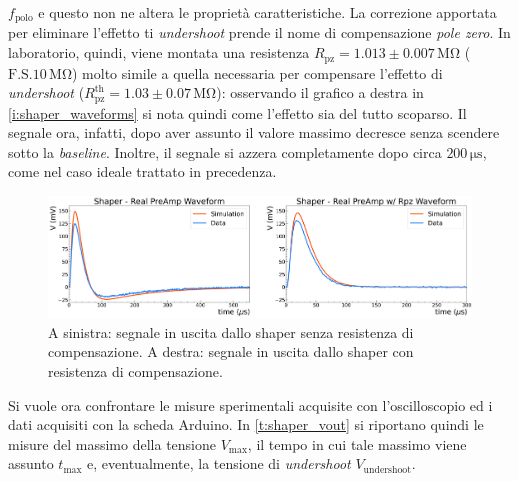 \documentclass[a4paper,11pt]{article} %
\begin{document}
$f_{\text{polo}}$ e questo non ne altera le proprietà caratteristiche. La correzione apportata per eliminare l'effetto ti
\textit{undershoot} prende il nome di compensazione \textit{pole zero}. In laboratorio, quindi, viene montata una
resistenza $R_{\text{pz}} = 1.013 \pm 0.007 \, \si{\mega\ohm}$ ($\text{F.S.} 10\,\si{\mega\ohm}$) molto simile a quella
necessaria per compensare l'effetto di \textit{undershoot} ($R_{\text{pz}}^{\text{th}} = 1.03 \pm 0.07 \,
\si{\mega\ohm}$): osservando il grafico a destra in \autoref{i:shaper_waveforms} si nota quindi come l'effetto sia del
tutto scoparso. Il segnale ora, infatti, dopo aver assunto il valore massimo decresce senza scendere sotto la
\textit{baseline}. Inoltre, il segnale si azzera completamente dopo circa $200\,\si{\us}$, come nel caso ideale trattato
in precedenza.
\begin{figure}[H]
	\centering
	\includegraphics[width=\linewidth]{../Plots/Shaper/shaper_preamp_waveforms.png}
	\caption{\small A sinistra: segnale in uscita dallo shaper senza resistenza di compensazione. 
					A destra: segnale in uscita dallo shaper con resistenza di compensazione.}
	\label{i:shaper_waveforms}
\end{figure}
\noindent Si vuole ora confrontare le misure sperimentali acquisite con l'oscilloscopio ed i dati acquisiti con la scheda
Arduino. In \autoref{t:shaper_vout} si riportano quindi le misure del massimo della tensione $V_{\text{max}}$, il tempo in cui tale
massimo viene assunto $t_{\text{max}}$ e, eventualmente, la tensione di \textit{undershoot} $V_{\text{undershoot}}$. 
\end{document}
